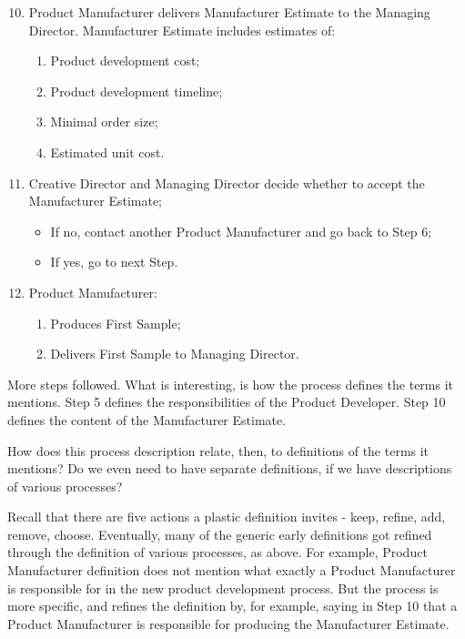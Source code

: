 \documentclass[graybox,envcountchap,sectrefs]{svmono}
\begin{document}
\begin{svgraybox}
\begin{enumerate}
\setcounter{enumi}{9}
	\item Product Manufacturer delivers Manufacturer Estimate to the Managing Director. Manufacturer Estimate includes estimates of:
		\begin{enumerate}
			\item Product development cost;
			\item Product development timeline;
			\item Minimal order size;
			\item Estimated unit cost.
		\end{enumerate}
	\item Creative Director and Managing Director decide whether to accept the Manufacturer Estimate; 
		\begin{itemize}
			\item If no, contact another Product Manufacturer and go back to Step 6;
			\item If yes, go to next Step.
		\end{itemize}
	\item Product Manufacturer:
		\begin{enumerate}
			\item Produces First Sample;
			\item Delivers First Sample to Managing Director.
		\end{enumerate}
\end{enumerate}
\end{svgraybox}

More steps followed. What is interesting, is how the process defines the terms it mentions. Step 5 defines the responsibilities of the Product Developer. Step 10 defines the content of the Manufacturer Estimate.

How does this process description relate, then, to definitions of the terms it mentions? Do we even need to have separate definitions, if we have descriptions of various processes? 

Recall that there are five actions a plastic definition invites - keep, refine, add, remove, choose. Eventually, many of the generic early definitions got refined through the definition of various processes, as above. For example, Product Manufacturer definition does not mention what exactly a Product Manufacturer is responsible for in the new product development process. But the process is more specific, and refines the definition by, for example, saying in Step 10 that a Product Manufacturer is responsible for producing the Manufacturer Estimate. 
\end{document}
